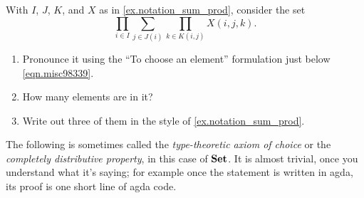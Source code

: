 \documentclass[Book-Poly]{subfiles}
\begin{document}
\begin{exercise}
With $I$, $J$, $K$, and $X$ as in \cref{ex.notation_sum_prod}, consider the set
\[\prod_{i\in I}\sum_{j\in J(i)}\prod_{k\in K(i,j)}X(i,j,k).\]
\begin{enumerate}
	\item Pronounce it using the ``To choose an element'' formulation just below \eqref{eqn.misc98339}.
	\item How many elements are in it?
	\item Write out three of them in the style of \cref{ex.notation_sum_prod}.
\qedhere
\end{enumerate}
\end{exercise}

The following is sometimes called the \emph{type-theoretic axiom of choice} or the \emph{completely distributive property}, in this case of $\textbf{Set}$. It is almost trivial, once you understand what it's saying; for example once the statement is written in agda, its proof is one short line of agda code. 
\end{document}
